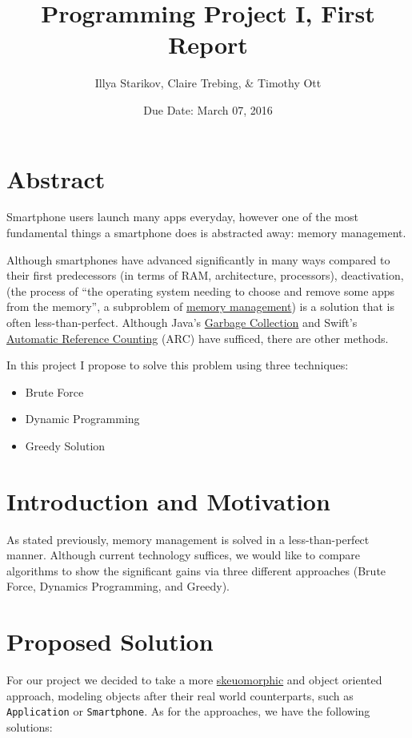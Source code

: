 \documentclass{article}
\title{Programming Project I, First Report}
\author{Illya Starikov, Claire Trebing, \& Timothy Ott}
\date{Due Date: March 07, 2016}
\begin{document}
\maketitle

\section{Abstract}
Smartphone users launch many apps everyday, however one of the most fundamental things a smartphone does is abstracted away: memory management.

Although smartphones have advanced significantly in many ways compared to their first predecessors (in terms of RAM, architecture, processors), deactivation, (the process of ``the operating system needing to choose and remove some apps from the memory'', a subproblem of \href{https://en.wikipedia.org/wiki/Memory_management}{memory management}) is a solution that is often less-than-perfect. Although Java's \href{http://www.oracle.com/webfolder/technetwork/tutorials/obe/java/gc01/index.html}{Garbage Collection} and Swift's \href{https://developer.apple.com/library/ios/documentation/Swift/Conceptual/Swift_Programming_Language/AutomaticReferenceCounting.html}{Automatic Reference Counting} (ARC) have sufficed, there are other methods.

In this project I propose to solve this problem using three techniques:

\begin{itemize}
    \item Brute Force
    \item Dynamic Programming
    \item Greedy Solution
\end{itemize}

\section{Introduction and Motivation}
As stated previously, memory management is solved in a less-than-perfect manner. Although current technology suffices, we would like to compare algorithms to show the significant gains via three different approaches (Brute Force, Dynamics Programming, and Greedy).

\section{Proposed Solution}
For our project we decided to take a more \href{https://en.wikipedia.org/wiki/Skeuomorph}{skeuomorphic} and object oriented approach, modeling objects after their real world counterparts, such as \texttt{Application} or \texttt{Smartphone}. As for the approaches, we have the following solutions:
\end{document}
